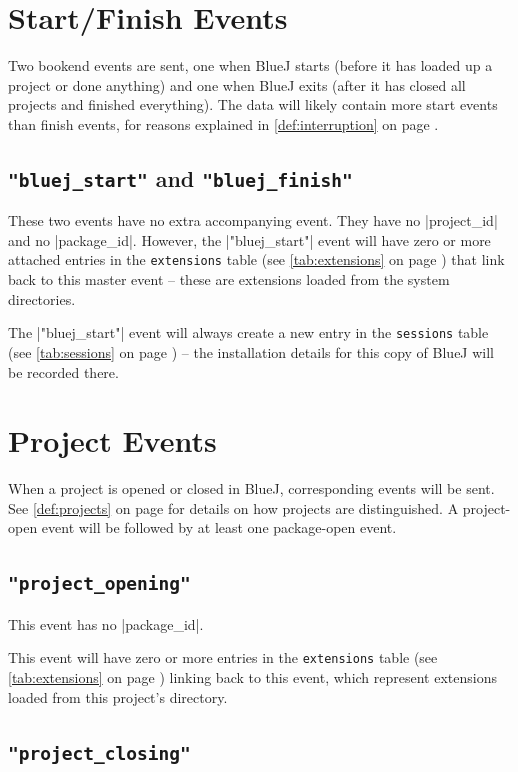 \documentclass{report}
\newcommand{\myref}[1]{\autoref{#1} on page \pageref*{#1}}
\newcommand{\tabref}[1]{\lstinline|#1| table (see \myref{tab:#1})}
\begin{document}
\section{Start/Finish Events}

Two bookend events are sent, one when BlueJ starts (before it has loaded up a
project or done anything) and one when BlueJ exits (after it has closed all
projects and finished everything).  The data will likely contain more start
events than finish events, for reasons explained in \myref{def:interruption}.

\subsection{\lstinline!"bluej_start"! and \lstinline!"bluej_finish"!}

These two events have no extra accompanying event.  They have no |project_id|
and no |package_id|.  However, the |"bluej_start"| event will have zero or more
attached entries in the \tabref{extensions} that link back to this master
event -- these are extensions loaded from the system directories.

The |"bluej_start"| event will always create a new entry in the
\tabref{sessions} -- the installation details for this copy of BlueJ will be
recorded there.

\section{Project Events}

When a project is opened or closed in BlueJ, corresponding events will be
sent.  See \myref{def:projects} for details on how projects are
distinguished.  A project-open event will be followed by at least one
package-open event.

\subsection{\lstinline!"project_opening"!}

This event has no |package_id|.

This event will have zero or more entries in the \tabref{extensions} linking
back to this event, which represent extensions loaded from this project's directory.

\subsection{\lstinline!"project_closing"!}
\end{document}
